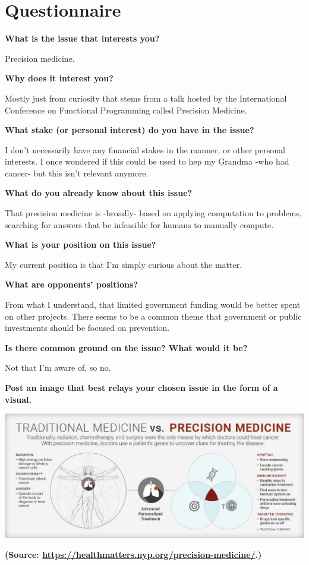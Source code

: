 \section*{Questionnaire}

\newcommand{\prompt}[2]{
    \textbf{{#1}}

    \hspace{10mm} {#2}\newline
}

\newcommand{\altPrompt}[2]{
    \textbf{{#1}}
    
    {#2}\newline
}


\prompt{What is the issue that interests you?}{
    Precision medicine.
}

\prompt{Why does it interest you?}{
    Mostly just from curiosity that stems  from a talk hosted by the International Conference on Functional Programming called Precision Medicine.
}

\prompt{What stake (or personal interest) do you have in the issue?}{
    I don’t necessarily have any financial stakes in the manner, or other personal interests. I once wondered if this could be used to hep my Grandma -who had cancer- but this isn’t relevant anymore.
}

\prompt{What do you already know about this issue?}{
    That precision medicine is -broadly- based on applying computation to problems, searching for answers that be infeasible for humans to manually compute.
}

\prompt{What is your position on this issue?}{
    My current position is that I’m simply curious about the matter.
}

\prompt{What are opponents’ positions?}{
    From what I understand, that limited government funding would be better spent on other projects. There seems to be a common theme that government or public investments should be focused on prevention.
}

\prompt{Is there common ground on the issue? What would it be?}{
    Not that I’m aware of, so no.
}

\altPrompt{Post an image that best relays your chosen issue in the form of a visual.}{
    \includegraphics[scale=0.4]{../assets/infographic1.jpg}
    
    \textbf{(Source: \url{https://healthmatters.nyp.org/precision-medicine/}.)}
}


